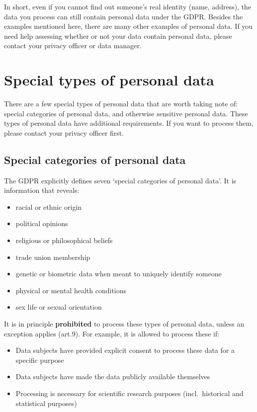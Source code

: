 \documentclass[
]{book}
\providecommand{\tightlist}{%
  \setlength{\itemsep}{0pt}\setlength{\parskip}{0pt}}
\begin{document}
In short, even if you cannot find out someone's real identity (name, address),
the data you process can still contain personal data under the GDPR. Besides
the examples mentioned here, there are many
other examples of personal data. If you need help assessing whether or not your
data contain personal data, please contact your
privacy officer
or data manager.

\hypertarget{special-types-personal-data}{%
\section{Special types of personal data}\label{special-types-personal-data}}

There are a few special types of personal data that are worth taking note of:
special categories of personal data, and otherwise sensitive personal data.
These types of personal data have additional requirements. If you want to
process them, please contact your
privacy officer
first.

\hypertarget{special-categories-of-personal-data}{%
\subsection{Special categories of personal data}\label{special-categories-of-personal-data}}

The GDPR explicitly defines seven `special categories of personal data'. It is
information that reveals:

\begin{itemize}
\tightlist
\item
  racial or ethnic origin
\item
  political opinions
\item
  religious or philosophical beliefs
\item
  trade union membership
\item
  genetic or biometric data when meant to uniquely identify someone
\item
  physical or mental health conditions
\item
  sex life or sexual orientation
\end{itemize}

It is in principle \textbf{prohibited} to process these types of personal data,
unless an exception applies
(art.9). For
example, it is allowed to process these if:

\begin{itemize}
\tightlist
\item
  Data subjects have provided explicit consent to process these data for a
  specific purpose
\item
  Data subjects have made the data publicly available themselves
\item
  Processing is necessary for scientific research purposes (incl.~historical
  and statistical purposes)
\end{itemize}
\end{document}
